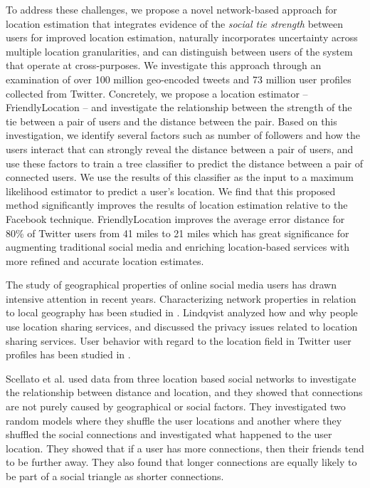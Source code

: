 To address these challenges, we propose a novel network-based approach for
location estimation that
  integrates evidence of the \textit{social tie strength} between users for improved location estimation,
  naturally incorporates uncertainty across multiple location granularities,
  and can distinguish between users of the system that operate at cross-purposes.
We investigate this approach through an examination of over 100 million
geo-encoded tweets and 73 million user profiles collected from Twitter.
%
Concretely, we propose a location estimator -- FriendlyLocation -- and
investigate the relationship between the strength of the tie between a pair of
users and the distance between the pair.
%
Based on this investigation, we identify several factors such as number of
followers and how the users interact that can strongly reveal the distance
between a pair of users, and use these factors to train a tree classifier to
predict the distance between a pair of connected users.
%
We use the results of this classifier as the input to a maximum likelihood
estimator to predict a user's location.
%
We find that this proposed method significantly improves the results of
location estimation relative to the Facebook technique.
%
FriendlyLocation improves the average error distance for 80\% of Twitter users
from 41 miles to 21 miles which has great significance for augmenting
traditional social media and enriching location-based services with more
refined and accurate location estimates.



The study of geographical properties of online social media users has drawn
intensive attention in recent years.
%
Characterizing network properties in relation to local geography has been
studied in \cite{yardi2010tweeting}.
%
Lindqvist \cite{lindqvist2011mayor} analyzed how and why people use location
sharing services, and discussed the privacy issues related to location sharing
services.
%
User behavior with regard to the location field in Twitter user profiles has
been studied in \cite{hecht2011tweets}.

Scellato et al.  \cite{scellato2011socio} used data from three location based
social networks to investigate the relationship between distance and location,
and they showed that connections are not purely caused by geographical or
social factors.
%
They investigated two random models where they shuffle the user locations and
another where they shuffled the social connections and investigated what
happened to the user location.
%
They showed that if a user has more connections, then their friends tend to be
further away.
%
They also found that longer connections are equally likely to be part of a
social triangle as shorter connections.


